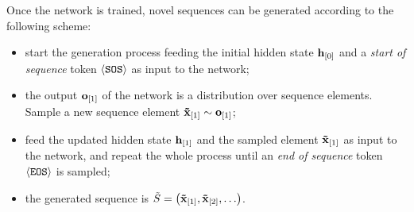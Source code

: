 Once the network is trained, novel sequences can be generated according to the following scheme:
\begin{itemize}
    \item start the generation process feeding the initial hidden state $\Elem{h}{0}$ and a \emph{start of sequence} token $\mathtt{\langle SOS \rangle}$ as input to the network;
    \item the output $\Elem{o}{1}$ of the network is a distribution over sequence elements. Sample a new sequence element $\Elem{\tilde{x}}{1} \sim \Elem{o}{1}$;
    \item feed the updated hidden state $\Elem{h}{1}$ and the sampled element $\Elem{\tilde{x}}{1}$ as input to the network, and repeat the whole process until an \emph{end of sequence} token $\mathtt{\langle EOS \rangle}$ is sampled;
    \item the generated sequence is $\tilde{S} = \Seq{\Elem{\tilde{x}}{1}, \Elem{\tilde{x}}{2}, \ldots}$.
\end{itemize}

